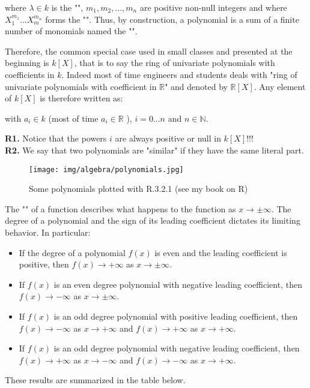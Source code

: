 	where $\lambda \in k$ is the "", $m_1,m_2,...,m_n$ are positive non-null integers and where $X_1^{m_1}...X_m^{m_n}$ forms the "". Thus, by construction, a polynomial is a sum of a finite number of monomials named the "".
	
	Therefore, the common special case used in small classes and presented at the beginning is $k[X]$, that is to say the ring of univariate polynomials with coefficients in $k$. Indeed most of time engineers and students deals with "ring of univariate polynomials with coefficient in $\mathbb{R}$" and denoted by $\mathbb{R}[X]$. Any element of $k[X]$ is therefore written as:
	
	with $a_i\in k$ (most of time  $a_i\in \mathbb{R}$ ), $i=0...n$ and $n\in \mathbb{N}$.
	\begin{tcolorbox}[title=Remarks,colframe=black,arc=10pt]
	\textbf{R1.} Notice that the powers $i$ are always positive or null in $k[X]$!!!\\
	
	\textbf{R2.} We say that two polynomials are "similar" if they have the same literal part.
	\end{tcolorbox}
	\begin{figure}[H]
		\centering
		\texttt{[image: img/algebra/polynomials.jpg]}
		\caption[Some polynomials plotted with R.3.2.1]{Some polynomials plotted with R.3.2.1 (see my book on R)}
	\end{figure}
	The "" of a function describes what happens to the function as $x\rightarrow \pm\infty$. The degree of a polynomial and the sign of its leading coefficient dictates its limiting behavior. In particular:
	\begin{itemize}
		\item If the degree of a polynomial $f(x)$ is even and the leading coefficient is positive, then $f(x)\rightarrow +\infty$ as $x\rightarrow \pm\infty$.
		\item If $f(x)$ is an even degree polynomial with negative leading coefficient, then $f(x)\rightarrow -\infty$ as $x\rightarrow \pm\infty$. 
		\item If $f(x)$ is an odd degree polynomial with positive leading coefficient, then $f(x)\rightarrow -\infty$ as $x\rightarrow +\infty$ and $f(x)\rightarrow +\infty$ as $x\rightarrow +\infty$.
 
		\item If $f(x)$ is an odd degree polynomial with negative leading coefficient, then $f(x)\rightarrow +\infty$ as $x\rightarrow -\infty$ and $f(x)\rightarrow -\infty$ as $x\rightarrow +\infty$.
	\end{itemize}
	These results are summarized in the table below.
	
